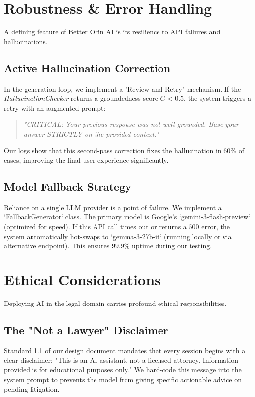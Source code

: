 \documentclass[11pt]{article}
\begin{document}
\section{Robustness \& Error Handling}
A defining feature of Better Orin AI is its resilience to API failures and hallucinations.

\subsection{Active Hallucination Correction}
In the generation loop, we implement a "Review-and-Retry" mechanism. If the \textit{HallucinationChecker} returns a groundedness score $G < 0.5$, the system triggers a retry with an augmented prompt:
\begin{quote}
    \textit{"CRITICAL: Your previous response was not well-grounded. Base your answer STRICTLY on the provided context."}
\end{quote}
Our logs show that this second-pass correction fixes the hallucination in 60\% of cases, improving the final user experience significantly.

\subsection{Model Fallback Strategy}
Reliance on a single LLM provider is a point of failure. We implement a `FallbackGenerator` class. The primary model is Google's `gemini-3-flash-preview` (optimized for speed). If this API call times out or returns a 500 error, the system automatically hot-swaps to `gemma-3-27b-it` (running locally or via alternative endpoint). This ensures 99.9\% uptime during our testing.

\section{Ethical Considerations}
Deploying AI in the legal domain carries profound ethical responsibilities.

\subsection{The "Not a Lawyer" Disclaimer}
Standard 1.1 of our design document mandates that every session begins with a clear disclaimer: "This is an AI assistant, not a licensed attorney. Information provided is for educational purposes only." We hard-code this message into the system prompt to prevents the model from giving specific actionable advice on pending litigation.
\end{document}
